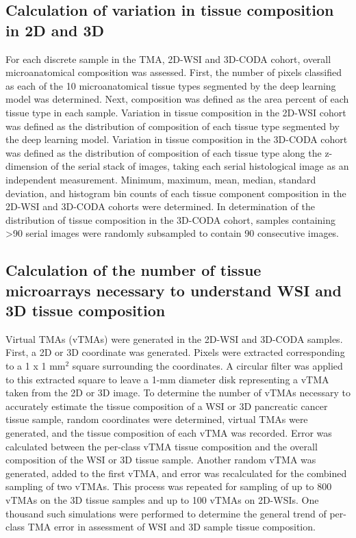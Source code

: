 \begin{refsection}
    \subsection{Calculation of variation in tissue composition in 2D and 3D}
    For each discrete sample in the TMA, 2D-WSI and 3D-CODA cohort, overall microanatomical composition was assessed. First, the number of pixels classified as each of the 10 microanatomical tissue types segmented by the deep learning model was determined. Next, composition was defined as the area percent of each tissue type in each sample. Variation in tissue composition in the 2D-WSI cohort was defined as the distribution of composition of each tissue type segmented by the deep learning model. Variation in tissue composition in the 3D-CODA cohort was defined as the distribution of composition of each tissue type along the z-dimension of the serial stack of images, taking each serial histological image as an independent measurement. Minimum, maximum, mean, median, standard deviation, and histogram bin counts of each tissue component composition in the 2D-WSI and 3D-CODA cohorts were determined. In determination of the distribution of tissue composition in the 3D-CODA cohort, samples containing >90 serial images were randomly subsampled to contain 90 consecutive images.
    
    \subsection{Calculation of the number of tissue microarrays necessary to understand WSI and 3D tissue composition}
    Virtual TMAs (vTMAs) were generated in the 2D-WSI and 3D-CODA samples. First, a 2D or 3D coordinate was generated. Pixels were extracted corresponding to a 1 x 1 mm$^2$ square surrounding the coordinates. A circular filter was applied to this extracted square to leave a 1-mm diameter disk representing a vTMA taken from the 2D or 3D image. To determine the number of vTMAs necessary to accurately estimate the tissue composition of a WSI or 3D pancreatic cancer tissue sample, random coordinates were determined, virtual TMAs were generated, and the tissue composition of each vTMA was recorded. Error was calculated between the per-class vTMA tissue composition and the overall composition of the WSI or 3D tissue sample. Another random vTMA was generated, added to the first vTMA, and error was recalculated for the combined sampling of two vTMAs. This process was repeated for sampling of up to 800 vTMAs on the 3D tissue samples and up to 100 vTMAs on 2D-WSIs. One thousand such simulations were performed to determine the general trend of per-class TMA error in assessment of WSI and 3D sample tissue composition.
    

\end{refsection}
